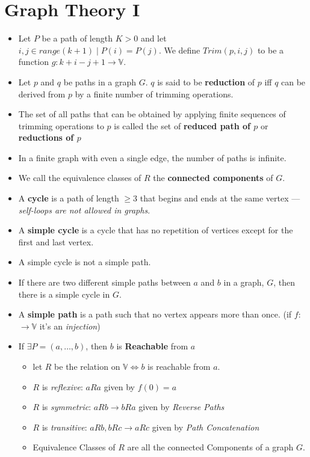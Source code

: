\documentclass[12pt]{scrartcl}
\begin{document}
\section{Graph Theory I}
\begin{itemize}
    \item Let $P$ be a path of length $K > 0$ and let $i,j \in range(k+1) \mid P(i) = P(j)$. We define $Trim(p,i,j)$ to be a function $g: k + i - j + 1 \rightarrow \mathbb{V}$.
    \item Let $p$ and $q$ be paths in a graph $G$. $q$ is said to be \textbf{reduction} of $p$ iff $q$ can be derived from $p$ by a finite number of trimming operations.
    \item The set of all paths that can be obtained by applying finite sequences of trimming operations to $p$ is called the set of \textbf{reduced path of $p$} or \textbf{reductions of $p$}
    \item In a finite graph with even a single edge, the number of paths is infinite.
    \item We call the equivalence classes of $R$ the \textbf{connected components} of $G$.
    \item A \textbf{cycle} is a path of length $\geq 3$ that begins and ends at the same vertex --- \textit{self-loops are not allowed in graphs}.
    \item A \textbf{simple cycle} is a cycle that has no repetition of vertices except for the first and last vertex.
    \item A simple cycle is not a simple path.
    \item If there are two different simple paths between $a$ and $b$ in a graph, $G$, then there is a simple cycle in $G$.
    \item A \textbf{simple path} is a path such that no vertex appears more than once. (if $f : $$\rightarrow \mathbb{V}$ it's an \textit{injection})
    \item If $\exists P = (a,\ldots, b)$, then $b$ is \textbf{Reachable}  from $a$

        \begin{itemize}
            \item let $R$ be the relation on $\mathbb{V} \iff b$ is reachable from $a$.
            \item $R$ is \textit{reflexive}: $aRa$ given by $f(0) = a$
            \item $R$ is \textit{symmetric}: $aRb \to bRa$ given by \textit{Reverse Paths}
            \item $R$ is \textit{transitive}: $aRb, bRc \to aRc$ given by \textit{Path Concatenation}
            \item Equivalence Classes of $R$ are all the connected Components of a graph $G$.
        \end{itemize}


\end{itemize}
\end{document}

